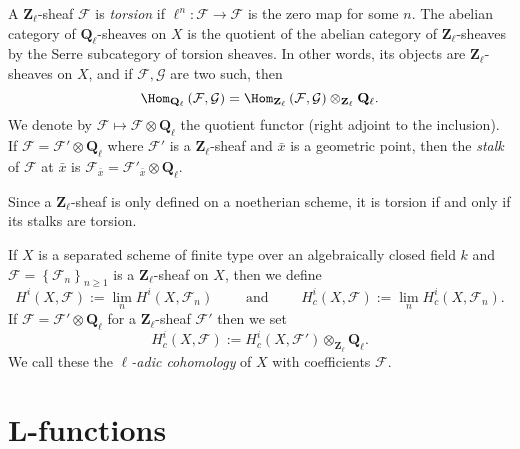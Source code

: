 \begin{definition}
\label{definition-torsion-l-adic-sheaf}
A $\mathbf{Z}_\ell$-sheaf $\mathcal{F}$ is {\it torsion} if $\ell^n:
\mathcal{F} \to \mathcal{F}$ is the zero map for some $n$. The abelian category
of $\mathbf{Q}_\ell$-sheaves on $X$ is the quotient of the abelian category of
$\mathbf{Z}_\ell$-sheaves by the Serre subcategory of torsion sheaves. In
other words, its objects are $\mathbf{Z}_\ell$-sheaves on $X$, and if
$\mathcal{F}, \mathcal{G}$ are two such, then
$$
\Hom_{\mathbf{Q}_\ell} \left(\mathcal{F}, \mathcal{G} \right) =
\Hom_{\mathbf{Z}_\ell} \left(\mathcal{F}, \mathcal{G}\right)
\otimes_{\mathbf{Z}_\ell} \mathbf{Q}_\ell.
$$
We denote by $\mathcal{F} \mapsto \mathcal{F} \otimes \mathbf{Q}_\ell$ the
quotient functor (right adjoint to the inclusion). If $\mathcal{F} =
\mathcal{F}' \otimes \mathbf{Q}_\ell$ where $\mathcal{F}'$ is a
$\mathbf{Z}_\ell$-sheaf and $\bar x$ is a geometric point, then the
{\it stalk} of $\mathcal{F}$ at $\bar x$ is $\mathcal{F}_{\bar x} =
\mathcal{F}'_{\bar x} \otimes \mathbf{Q}_\ell$.
\end{definition}

\begin{remark}
\label{remark-torsion-stalks}
Since a $\mathbf{Z}_\ell$-sheaf is only defined on a noetherian scheme, it is
torsion if and only if its stalks are torsion.
\end{remark}

\begin{definition}
\label{definition-cohomology-l-adic}
If $X$ is a separated scheme of finite type over an algebraically closed field
$k$ and $\mathcal{F} = \left\{\mathcal{F}_n\right\}_{n\geq 1}$ is a
$\mathbf{Z}_\ell$-sheaf on $X$, then we define
$$
H^i(X, \mathcal{F}) := \lim_n H^i(X, \mathcal{F}_n)
\qquad\text{ and }\qquad
H_c^i(X, \mathcal{F}) := \lim_n H_c^i(X, \mathcal{F}_n).
$$
If $\mathcal{F} = \mathcal{F}'\otimes \mathbf{Q}_\ell$ for a
$\mathbf{Z}_\ell$-sheaf $\mathcal{F}'$ then we set
$$
H_c^i(X , \mathcal{F}) := H_c^i(X,
\mathcal{F}')\otimes_{\mathbf{Z}_\ell}\mathbf{Q}_\ell.
$$
We call these the {\it $\ell$-adic cohomology} of $X$ with coefficients
$\mathcal{F}$.
\end{definition}





\section{L-functions}
\label{section-L-function}


